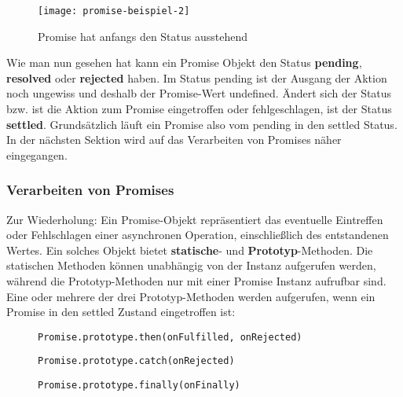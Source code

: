 \begin{figure}[H]
\centering
\texttt{[image: promise-beispiel-2]}
\caption{Promise hat anfangs den Status \glqq{}ausstehend\grqq{}}
\end{figure}

\noindent
Wie man nun gesehen hat kann ein Promise Objekt den Status \textbf{pending}, \textbf{resolved} oder \textbf{rejected} haben. Im Status pending ist der Ausgang der Aktion noch ungewiss und deshalb der Promise-Wert undefined. Ändert sich der Status bzw. ist die Aktion zum Promise eingetroffen oder fehlgeschlagen, ist der Status \textbf{settled}. Grundsätzlich läuft ein Promise also vom pending in den settled Status. In der nächsten Sektion wird auf das Verarbeiten von Promises näher eingegangen.

\subsubsection{Verarbeiten von Promises}

Zur Wiederholung: Ein Promise-Objekt repräsentiert das eventuelle Eintreffen oder Fehlschlagen einer asynchronen Operation, einschließlich des entstandenen Wertes. Ein solches Objekt bietet \textbf{statische}- und \textbf{Prototyp}-Methoden. Die statischen Methoden können unabhängig von der Instanz aufgerufen werden, während die Prototyp-Methoden nur mit einer Promise Instanz aufrufbar sind. Eine oder mehrere der drei Prototyp-Methoden werden aufgerufen, wenn ein Promise in den settled Zustand eingetroffen ist:

\begin{description}

\begin{figure}[H]
\item \begin{lstlisting}[basicstyle=\small]
Promise.prototype.then(onFulfilled, onRejected)
\end{lstlisting}
\end{figure}

\begin{figure}[H]
\item \begin{lstlisting}[basicstyle=\small]
Promise.prototype.catch(onRejected)
\end{lstlisting}
\end{figure}
 
\begin{figure}[H]
\item \begin{lstlisting}[basicstyle=\small]
Promise.prototype.finally(onFinally)
\end{lstlisting}
\end{figure}
 
\end{description}

